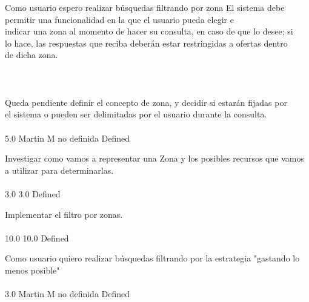 \vspace{20pt}

	{Como usuario espero realizar búsquedas filtrando por zona} %
	{El sistema debe permitir una funcionalidad en la que el usuario pueda elegir e\\
indicar una zona al momento de hacer su consulta, en caso de que lo desee; si\\
lo hace, las respuestas que reciba deberán estar restringidas a ofertas dentro\\
de dicha zona.\\
\\
  \\
\\
Queda pendiente definir el concepto de zona, y decidir si estarán fijadas por\\
el sistema o pueden ser delimitadas por el usuario durante la consulta.\\
\\
} %
	{} %
	{5.0} %
	{Martin M} %
	{no definida} %
	{Defined} %

		{Investigar como vamos a representar una Zona y los posibles recursos que vamos a utilizar para determinarlas.} %
		{\\
\\
} %
		{3.0} %
		{} %
		{3.0} %
		{Defined} %

		{Implementar el filtro por zonas.} %
		{\\
\\
} %
		{10.0} %
		{} %
		{10.0} %
		{Defined} %


\vspace{20pt}

	{Como usuario quiero realizar búsquedas filtrando por la estrategia "gastando lo menos posible"} %
	{\\
\\
} %
	{} %
	{3.0} %
	{Martin M} %
	{no definida} %
	{Defined} %


